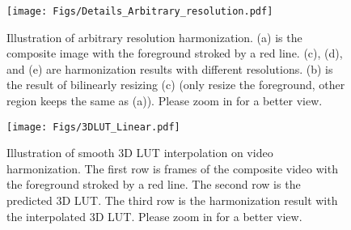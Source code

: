 \documentclass[10pt,journal,twocolumn,twoside]{IEEEtran}
\begin{document}
\begin{figure}[t]
  \centering
   \texttt{[image: Figs/Details\_Arbitrary\_resolution.pdf]}
   \caption{Illustration of arbitrary resolution harmonization. (a) is the composite image with the foreground stroked by a red line. (c), (d), and (e) are harmonization results with different resolutions. (b) is the result of bilinearly resizing (c) (only resize the foreground, other region keeps the same as (a)). Please zoom in for a better view.}
   \label{fig:Details_Arbitrary_resolution}
\end{figure}

\begin{figure}[t]
  \centering
   \texttt{[image: Figs/3DLUT\_Linear.pdf]}
   \caption{Illustration of smooth 3D LUT interpolation on video harmonization. The first row is frames of the composite video with the foreground stroked by a red line. The second row is the predicted 3D LUT. The third row is the harmonization result with the interpolated 3D LUT. Please zoom in for a better view.}
   \label{fig:3DLUT_linear}
\end{figure}
\end{document}
